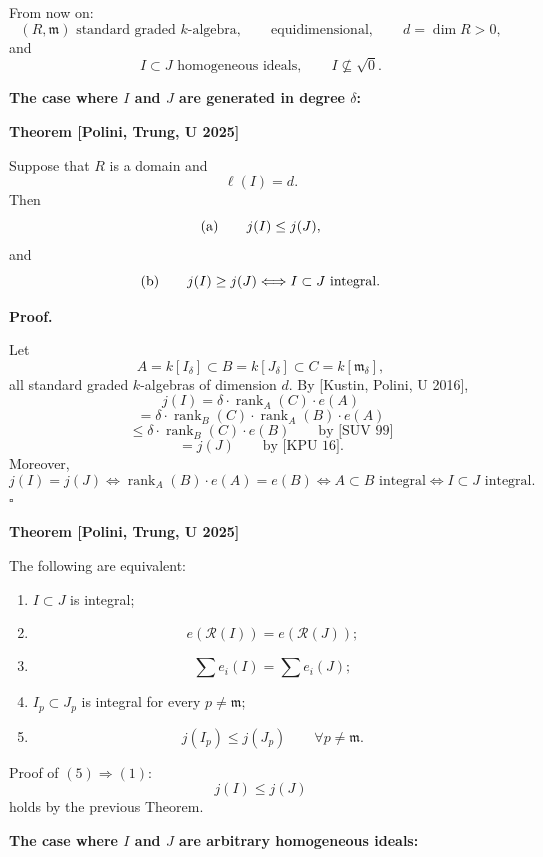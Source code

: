From now on:
$$
(R,\mathfrak{m})
\text{ standard graded $k$-algebra},
\qquad
\text{equidimensional},
\qquad
d=\dim R>0,
$$
and
$$
I\subset J
\text{ homogeneous ideals},
\qquad
I\not\subseteq\sqrt{0}.
$$

\medskip\noindent
{\bf The case where $I$ and $J$ are
generated in degree $\delta$:}

\medskip\noindent
{\bf Theorem [Polini, Trung, U 2025]}

Suppose that $R$ is a domain and
$$
\ell(I)=d.
$$
Then
$$
\textnormal{(a)}
\qquad
j(I)\leq j(J),
$$
and
$$
\textnormal{(b)}
\qquad
j(I)\geq j(J)
\Longleftrightarrow
I\subset J\text{ integral}.
$$

\medskip\noindent
{\bf Proof.}

Let
$$
A=k[I_\delta]
\subset
B=k[J_\delta]
\subset
C=k[\mathfrak{m}_\delta],
$$
all standard graded $k$-algebras of
dimension $d$.
By [Kustin, Polini, U 2016],
$$
j(I)
=
\delta\cdot
\operatorname{rank}_A(C)\cdot e(A)
$$
$$
=
\delta\cdot
\operatorname{rank}_B(C)\cdot
\operatorname{rank}_A(B)\cdot e(A)
$$
$$
\leq
\delta\cdot
\operatorname{rank}_B(C)\cdot e(B)
\qquad
\text{by [SUV 99]}
$$
$$
=
j(J)
\qquad
\text{by [KPU 16]}.
$$
Moreover,
$$
j(I)=j(J)
\Longleftrightarrow
\operatorname{rank}_A(B)\cdot e(A)=e(B)
\Longleftrightarrow
A\subset B\text{ integral}
\Longleftrightarrow
I\subset J\text{ integral}.
$$
\hfill$\square$

\medskip\noindent
{\bf Theorem [Polini, Trung, U 2025]}

The following are equivalent:
\begin{enumerate}
\item[(1)]
$I\subset J$ is integral;

\item[(2)]
$$
e(\mathcal{R}(I))
=
e(\mathcal{R}(J));
$$

\item[(3)]
$$
\sum e_i(I)
=
\sum e_i(J);
$$

\item[(4)]
$I_p\subset J_p$ is integral for every
$p\neq\mathfrak{m}$;

\item[(5)]
$$
j(I_p)\leq j(J_p)
\qquad
\forall p\neq\mathfrak{m}.
$$
\end{enumerate}

Proof of $(5)\Rightarrow(1)$:
$$
j(I)\leq j(J)
$$
holds by the previous Theorem.


\medskip\noindent
{\bf The case where $I$ and $J$ are
arbitrary homogeneous ideals:}

